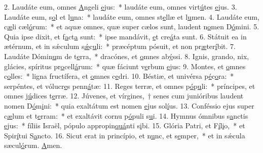 2. Laudáte eum, omnes \uline{A}ngeli \uline{e}jus:~* laudáte eum, omnes virt\uline{ú}tes \uline{e}jus.
3. Laudáte eum, s\uline{o}l et l\uline{u}na:~* laudáte eum, omnes st\uline{e}llæ et l\uline{u}men.
4. Laudáte eum, c\uline{æ}li cæl\uline{ó}rum:~* et aquæ omnes, quæ super cælos sunt, laudent n\uline{o}men D\uline{ó}mini.
5. Quia ipse dixit, et f\uline{a}ct\uline{a} sunt:~* ipse mandávit, \uline{e}t cre\uline{á}ta sunt.
6. Státuit ea in ætérnum, et in sǽculum s\uline{ǽ}c\uline{u}li:~* præcéptum pósuit, et non pr\uline{æ}ter\uline{í}bit.
7. Laudáte Dómin\uline{u}m de t\uline{e}rra,~* dracónes, et \uline{o}mnes ab\uline{ý}ssi.
8. Ignis, grando, nix, glácies, spíritus pr\uline{o}cell\uline{á}rum:~* quæ fáciunt v\uline{e}rbum \uline{e}jus:
9. Montes, et \uline{o}mnes c\uline{o}lles:~* ligna fructífera, et \uline{o}mnes c\uline{e}dri.
10. Béstiæ, et univérsa p\uline{é}c\uline{o}ra:~* serpéntes, et vólucr\uline{e}s penn\uline{á}tæ:
11. Reges terræ, et omnes p\uline{ó}p\uline{u}li:~* príncipes, et omnes j\uline{ú}dices t\uline{e}rræ.
12. Júvenes, et vírgines,~† senes cum junióribus laudent nomen D\uline{ó}m\uline{i}ni:~* quia exaltátum est nomen \uline{e}jus sol\uline{í}us.
13. Conféssio ejus super c\uline{æ}lum et t\uline{e}rram:~* et exaltávit cornu p\uline{ó}puli s\uline{u}i.
14. Hymnus ómnibus s\uline{a}nctis \uline{e}jus:~* fíliis Israël, pópulo appropin\uline{quá}nti s\uline{i}bi.
15. Glória Patri, et F\uline{í}l\uline{i}o,~* et Spir\uline{í}tui S\uline{a}ncto.
16. Sicut erat in princípio, et n\uline{u}nc, et s\uline{e}mper,~* et in sǽcula sæcul\uline{ó}rum. \uline{A}men.
